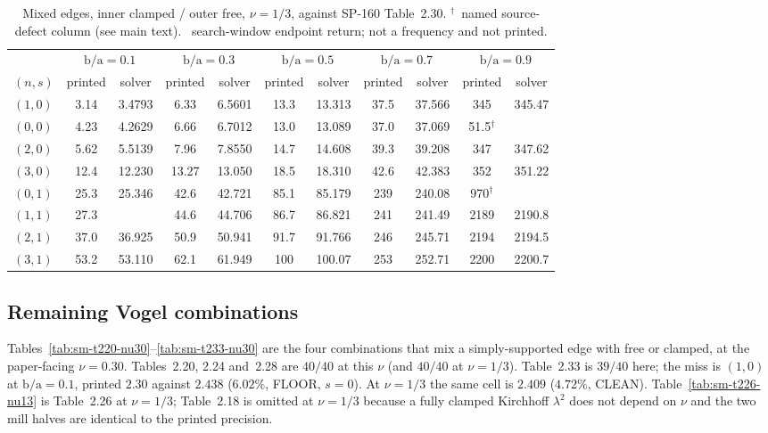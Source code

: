 \documentclass[11pt]{article}
\newcommand{\lamsq}{\lambda^{2}}
\newcommand{\ba}{\mbox{b/a}}
\newcommand{\winend}{\mbox{\textsection}}
\begin{document}
\begin{table}[htbp]\centering\footnotesize
\caption{Mixed edges, inner clamped / outer free, $\nu=1/3$, against SP-160
Table~2.30. $^{\dagger}$~named source-defect column (see main text).
\winend~search-window endpoint return; not a frequency and not printed.}
\label{tab:sm-t230-nu13}
\begin{tabular}{lcccccccccc}
\toprule
& \multicolumn{2}{c}{$\ba=0.1$} & \multicolumn{2}{c}{$\ba=0.3$}
& \multicolumn{2}{c}{$\ba=0.5$} & \multicolumn{2}{c}{$\ba=0.7$}
& \multicolumn{2}{c}{$\ba=0.9$}\\
\cmidrule(lr){2-3}\cmidrule(lr){4-5}\cmidrule(lr){6-7}\cmidrule(lr){8-9}\cmidrule(lr){10-11}
$(n,s)$ & printed & solver & printed & solver & printed & solver
& printed & solver & printed & solver\\
\midrule
$(1,0)$ & 3.14 & 3.4793 & 6.33 & 6.5601 & 13.3 & 13.313 & 37.5 & 37.566 & 345 & 345.47 \\
$(0,0)$ & 4.23 & 4.2629 & 6.66 & 6.7012 & 13.0 & 13.089 & 37.0 & 37.069 & 51.5$^{\dagger}$ & \winend \\
$(2,0)$ & 5.62 & 5.5139 & 7.96 & 7.8550 & 14.7 & 14.608 & 39.3 & 39.208 & 347 & 347.62 \\
$(3,0)$ & 12.4 & 12.230 & 13.27 & 13.050 & 18.5 & 18.310 & 42.6 & 42.383 & 352 & 351.22 \\
$(0,1)$ & 25.3 & 25.346 & 42.6 & 42.721 & 85.1 & 85.179 & 239 & 240.08 & 970$^{\dagger}$ & \winend \\
$(1,1)$ & 27.3 & \winend & 44.6 & 44.706 & 86.7 & 86.821 & 241 & 241.49 & 2189 & 2190.8 \\
$(2,1)$ & 37.0 & 36.925 & 50.9 & 50.941 & 91.7 & 91.766 & 246 & 245.71 & 2194 & 2194.5 \\
$(3,1)$ & 53.2 & 53.110 & 62.1 & 61.949 & 100 & 100.07 & 253 & 252.71 & 2200 & 2200.7 \\
\bottomrule
\end{tabular}
\end{table}

\subsection{Remaining Vogel combinations}\label{sec:sm-nine}
Tables~\ref{tab:sm-t220-nu30}--\ref{tab:sm-t233-nu30} are the four
combinations that mix a simply-supported edge with free or clamped, at
the paper-facing $\nu=0.30$. Tables~2.20, 2.24 and~2.28 are $40/40$ at
this $\nu$ (and $40/40$ at $\nu=1/3$). Table~2.33 is $39/40$ here; the
miss is $(1,0)$ at $\ba=0.1$, printed $2.30$ against $2.438$
($6.02\%$, FLOOR, $s=0$). At $\nu=1/3$ the same cell is $2.409$
($4.72\%$, CLEAN). Table~\ref{tab:sm-t226-nu13} is Table~2.26 at
$\nu=1/3$; Table~2.18 is omitted at $\nu=1/3$ because a fully clamped
Kirchhoff $\lamsq$ does not depend on $\nu$ and the two mill halves are
identical to the printed precision.
\end{document}
